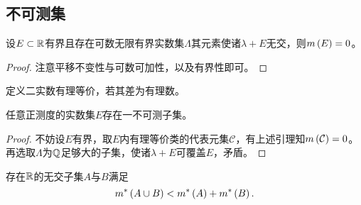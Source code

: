 \documentclass{ctexrep}
\begin{document}
  \subsection{不可测集}
  \begin{lemma}
    设$E\subset\mathbb{R}$有界且存在可数无限有界实数集$\Lambda$其元素使诸$\lambda+E$无交，则$m\left(E\right)=0$。
  \end{lemma}
  \begin{proof}
    注意平移不变性与可数可加性，以及有界性即可。
  \end{proof}
  \begin{definition}
    定义二实数有理等价，若其差为有理数。
  \end{definition}
  \begin{theorem}[Vitali]
    任意正测度的实数集$E$存在一不可测子集。
  \end{theorem}
  \begin{proof}
    不妨设$E$有界，取$E$内有理等价类的代表元集$\mathcal{C}$，有上述引理知$m\left(\mathcal{C}\right)=0$。再选取$\Lambda$为$\mathbb{Q}$足够大的子集，使诸$\lambda+E$可覆盖$E$，矛盾。
  \end{proof}
  \begin{theorem}
    存在$\mathbb{R}$的无交子集$A$与$B$满足
    \[ m^*\left(A\cup B\right) < m^*\left(A\right) + m^*\left(B\right). \]
  \end{theorem}
\end{document}
